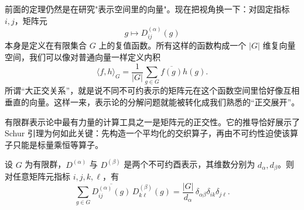 前面的定理仍然是在研究"表示空间里的向量"。现在把视角换一下：对固定指标 $i,j$，矩阵元
\[
g\longmapsto D^{(\alpha)}_{ij}(g)
\]
本身是定义在有限集合 $G$ 上的复值函数。所有这样的函数构成一个 $|G|$ 维复向量空间，我们可以像对普通向量一样定义内积
\[
\langle f,h\rangle_G=\frac1{|G|}\sum_{g\in G}\overline{f(g)}h(g).
\]
所谓“大正交关系”，就是说不同不可约表示的矩阵元在这个函数空间里恰好像互相垂直的向量。这样一来，表示论的分解问题就能被转化成我们熟悉的“正交展开”。

有限群表示论中最有力量的计算工具之一是矩阵元的正交性。它的推导恰好展示了 Schur 引理为何如此关键：先构造一个平均化的交织算子，再由不可约性迫使该算子只能是标量乘恒等算子。

\begin{theorem}[大正交关系]
设 $G$ 为有限群，$D^{(\alpha)}$ 与 $D^{(\beta)}$ 是两个不可约酉表示，其维数分别为 $d_\alpha,d_\beta$。则对任意矩阵元指标 $i,j,k,\ell$，有
\[
\sum_{g\in G} \overline{D^{(\alpha)}_{ij}(g)}\,D^{(\beta)}_{k\ell}(g)
=\frac{|G|}{d_\alpha}\,\delta_{\alpha\beta}\delta_{ik}\delta_{j\ell}.
\]
\label{thm:great-orthogonality}

\end{theorem}

